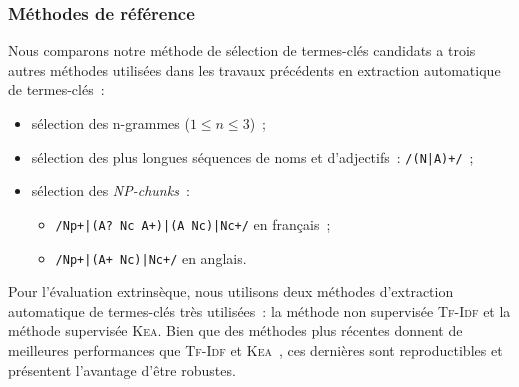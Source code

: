       \subsubsection{Méthodes de référence}
      \label{subsubsec:main-automatic_keyphrase_annotation-keyphrase_candidate_selection-evaluation-baselines}
        Nous comparons notre méthode de sélection de termes-clés candidats a
        trois autres méthodes utilisées dans les travaux précédents en
        extraction automatique de termes-clés~:
        \begin{itemize}
          \item{sélection des n-grammes ($1 \leq n \leq 3$)~;}
          \item{sélection des plus longues séquences de noms et d'adjectifs~:
                \texttt{/(N|A)+/}~;}
          \item{sélection des \textit{NP-chunks}~:}
          \begin{itemize}
            \item{\texttt{/Np+|(A? Nc A+)|(A Nc)|Nc+/} en français~;}
            \item{\texttt{/Np+|(A+ Nc)|Nc+/} en anglais.}
          \end{itemize}
        \end{itemize}

        Pour l'évaluation extrinsèque, nous utilisons deux méthodes d'extraction
        automatique de termes-clés très utilisées~: la méthode non supervisée
        \textsc{Tf-Idf} et la méthode supervisée \textsc{Kea}. Bien que des
        méthodes plus récentes donnent de meilleures performances que
        \textsc{Tf-Idf} et \textsc{Kea}~\cite{kim2010semeval}, ces dernières
        sont reproductibles et présentent l'avantage d'être robustes.


